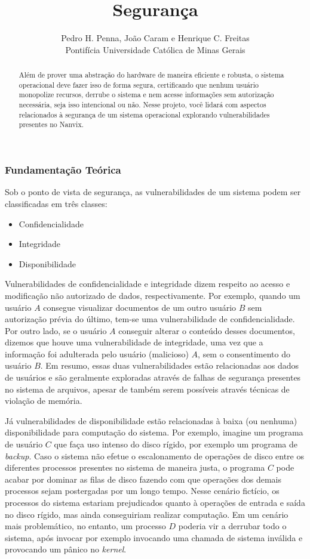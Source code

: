 \documentclass[11pt]{article}
\title{Segurança}
\author{Pedro H. Penna, João Caram e Henrique C. Freitas\\[0.3em]
\small Pontifícia Universidade Católica de Minas Gerais}
\date{}
\begin{document}
\maketitle

\begin{abstract}

\noindent
Além de prover uma abstração do hardware de maneira eficiente e robusta, o sistema operacional deve fazer isso de forma segura, certificando que nenhum usuário monopolize recursos, derrube o sistema e nem acesse informações sem autorização necessária, seja isso intencional ou não. Nesse projeto, você lidará com aspectos relacionados à segurança de um sistema operacional explorando vulnerabilidades presentes no Nanvix.

\end{abstract}

\subsubsection*{Fundamentação Teórica}

Sob o ponto de vista de segurança, as vulnerabilidades de um sistema podem ser classificadas em três classes:

\begin{itemize}
	\item Confidencialidade
	\item Integridade
	\item Disponibilidade
\end{itemize}

Vulnerabilidades de confidencialidade e integridade dizem respeito ao acesso e modificação não autorizado de dados, respectivamente. Por exemplo, quando um usuário $A$ consegue visualizar documentos de um outro usuário $B$ sem autorização prévia do último, tem-se uma vulnerabilidade de confidencialidade. Por outro lado, se o usuário $A$ conseguir alterar o conteúdo desses documentos, dizemos que houve uma vulnerabilidade de integridade, uma vez que a informação foi adulterada pelo usuário (malicioso) $A$, sem o consentimento do usuário $B$. Em resumo, essas duas vulnerabilidades estão relacionadas aos dados de usuários e são geralmente exploradas através de falhas de segurança presentes no sistema de arquivos, apesar de também serem possíveis através técnicas de violação de memória.

Já vulnerabilidades de disponibilidade estão relacionadas à baixa (ou nenhuma) disponibilidade para computação do sistema. Por exemplo, imagine um programa de usuário $C$ que faça uso intenso do disco rígido, por exemplo um programa de \textit{backup}. Caso o sistema não efetue o escalonamento de operações de disco entre os diferentes processos presentes no sistema de maneira justa, o programa $C$ pode acabar por dominar as filas de disco fazendo com que operações dos demais processos sejam postergadas por um longo tempo. Nesse cenário fictício, os processos do sistema estariam prejudicados quanto à operações de entrada e saída no disco rígido, mas ainda conseguiriam realizar computação. Em um cenário mais problemático, no entanto, um processo $D$ poderia vir a derrubar todo o sistema, após invocar por exemplo invocando uma chamada de sistema inválida e provocando um pânico no \textit{kernel}.
\end{document}
